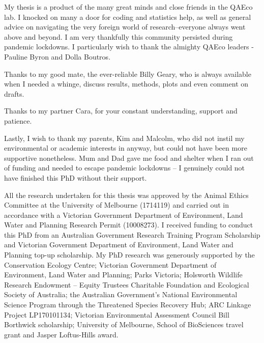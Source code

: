 \documentclass[11pt,a4paper,titlepage,twoside,openright]{style/unimelbthesis}
\begin{document}
\begin{frontmatter}
\begin{acknowledgements}
    My thesis is a product of the many great minds and close friends in the QAEco lab. I knocked on many a door for coding and statistics help, as well as general advice on navigating the very foreign world of research--everyone always went above and beyond. I am very thankfully this community persisted during pandemic lockdowns.
    I particularly wish to thank the almighty QAEco leaders - Pauline Byron and Dolla Boutros.
    
    Thanks to my good mate, the ever-reliable Billy Geary, who is always available when I needed a whinge, discuss results, methods, plots and even comment on drafts.
    
    Thanks to my partner Cara, for your constant understanding, support and patience.
    
    Lastly, I wish to thank my parents, Kim and Malcolm, who did not instil my environmental or academic interests in anyway, but could not have been more supportive nonetheless. Mum and Dad gave me food and shelter when I ran out of funding and needed to escape pandemic lockdowns -- I genuinely could not have finished this PhD without their support.
    
    All the research undertaken for this thesis was approved by the Animal Ethics Committee at the University of Melbourne (1714119) and carried out in accordance with a Victorian Government Department of Environment, Land Water and Planning Research Permit (10008273). I received funding to conduct this PhD from an Australian Government Research Training Program Scholarship and Victorian Government Department of Environment, Land Water and Planning top-up scholarship. My PhD research was generously supported by the Conservation Ecology Centre; Victorian Government Department of Environment, Land Water and Planning; Parks Victoria; Holsworth Wildlife Research Endowment -- Equity Trustees Charitable Foundation and Ecological Society of Australia; the Australian Government's National Environmental Science Program through the Threatened Species Recovery Hub; ARC Linkage Project LP170101134; Victorian Environmental Assessment Council Bill Borthwick scholarship; University of Melbourne, School of BioSciences travel grant and Jasper Loftus-Hills award.
  \end{acknowledgements}

  \hypersetup{linkcolor=black}
  \setcounter{tocdepth}{2}
  \tableofcontents



\end{frontmatter}
\end{document}
